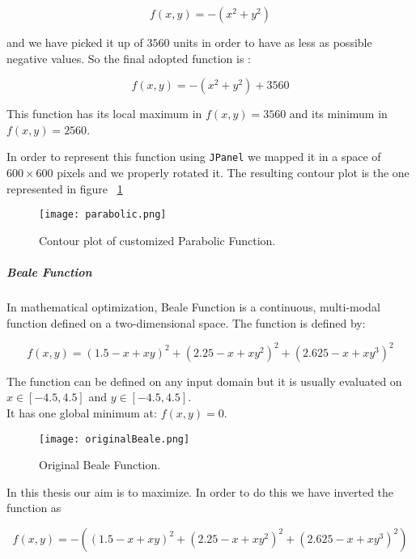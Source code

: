 \begin{equation}
f(x, y) = -(x^2 + y^2)
\end{equation}

and we have picked it up of $3560$ units in order to have as less as possible negative values. So the final adopted function is :

\begin{equation}
f(x, y) = -(x^2 + y^2) + 3560
\end{equation}

This function has its local maximum in $f(x, y) = 3560$ and its minimum in $f(x, y) = 2560$.

In order to represent this function using {\tt JPanel} we mapped it in a space of $600 \times 600$ pixels and we properly rotated it. The resulting contour plot is the one represented in figure ~\ref{fig:ContourPlotCustomizedParabolicFunction} 

\begin{figure}[h!]
	\centering
	\texttt{[image: parabolic.png]}
	\caption{Contour plot of customized Parabolic Function.}
	\label{fig:ContourPlotCustomizedParabolicFunction}
\end{figure}

\subparagraph{Beale Function} In mathematical optimization, Beale Function is a continuous, multi-modal function defined on a two-dimensional space. The function is defined by: 

\begin{equation}
f(x, y) = (1.5 - x + xy)^2 + (2.25 - x + xy^2)^2 + (2.625 - x + xy^3)^2
\end{equation}

The function can be defined on any input domain but it is usually evaluated on $x \in [-4.5, 4.5]$ and $y \in [-4.5, 4.5]$. \\

It has one global minimum at: $f(x, y) = 0$.

\begin{figure}[h!]
	\centering
	\texttt{[image: originalBeale.png]}
	\caption{Original Beale Function.}
	\label{fig:OriginalBealeFunction}
\end{figure}

In this thesis our aim is to maximize. In order to do this we have inverted the function as

\begin{equation}
f(x, y) = -((1.5 - x + xy)^2 + (2.25 - x + xy^2)^2 + (2.625 - x + xy^3)^2)
\end{equation}

